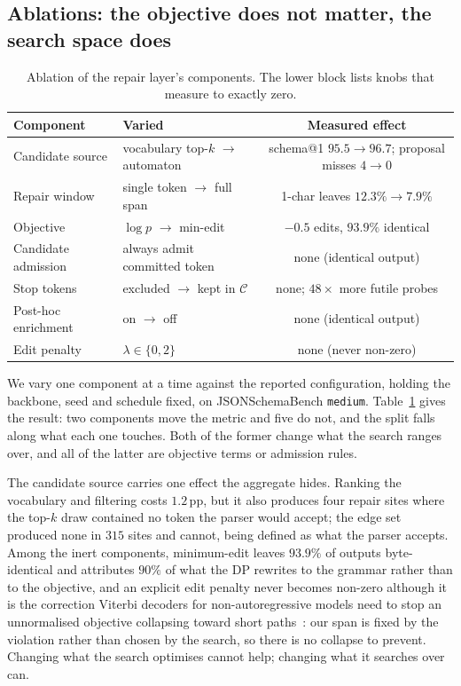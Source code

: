 \documentclass{article}
\begin{document}
\subsection{Ablations: the objective does not matter, the search space does}
\label{sec:ablation}

\begin{table}[h]
\centering
\small
\caption{Ablation of the repair layer's components. The lower block lists
knobs that measure to exactly zero.}
\label{tab:ablation}
\begin{tabular}{llc}
\toprule
Component & Varied & Measured effect \\
\midrule
Candidate source     & vocabulary top-$k$ $\to$ automaton & schema@1 $95.5\to96.7$; proposal misses $4\to0$ \\
Repair window        & single token $\to$ full span       & 1-char leaves $12.3\%\to7.9\%$ \\
\midrule
Objective            & $\log p$ $\to$ min-edit            & $-0.5$ edits, $93.9\%$ identical \\
Candidate admission  & always admit committed token       & none (identical output) \\
Stop tokens          & excluded $\to$ kept in $\mathcal{C}$ & none; $48\times$ more futile probes \\
Post-hoc enrichment  & on $\to$ off                       & none (identical output) \\
Edit penalty & $\lambda\in\{0,2\}$ & none (never non-zero) \\
\bottomrule
\end{tabular}
\end{table}

We vary one component at a time against the reported configuration, holding the
backbone, seed and schedule fixed, on JSONSchemaBench \texttt{medium}.
Table~\ref{tab:ablation} gives the result: two components move the metric and
five do not, and the split falls along what each one touches. Both of the
former change what the search ranges over, and all of the latter are objective
terms or admission rules.

The candidate source carries one effect the aggregate hides. Ranking the
vocabulary and filtering costs $1.2$\,pp, but it also produces four repair sites
where the top-$k$ draw contained no token the parser would accept; the edge set
produced none in $315$ sites and cannot, being defined as what the parser
accepts. Among the inert components, minimum-edit leaves $93.9\%$ of outputs
byte-identical and attributes $90\%$ of what the DP rewrites to the grammar
rather than to the objective, and an explicit edit penalty never becomes
non-zero although it is the correction Viterbi decoders for non-autoregressive
models need to stop an unnormalised objective collapsing toward short
paths~\citep{shao2022viterbi,chen2024controldag}: our span is fixed by the
violation rather than chosen by the search, so there is no collapse to prevent.
Changing what the search optimises cannot help; changing what it searches over
can.
\end{document}
